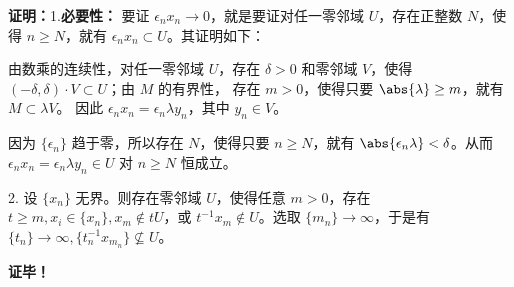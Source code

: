\textbf{证明：}1.\textbf{必要性：} 要证 $\epsilon_n x_n\rightarrow0$，就是要证对任一零邻域 $U$，存在正整数 $N$，使得 $n\geq N$，就有 $\epsilon_n x_n\subset U$。其证明如下：

由数乘的连续性，对任一零邻域 $U$，存在 $\delta>0$ 和零邻域 $V$，使得 $(-\delta,\delta)\cdot V\subset U$；由 $M$ 的有界性， 存在 $m>0$，使得只要 $\abs{\lambda}\geq m$，就有 $M\subset\lambda V$。 因此 $\epsilon_nx_n=\epsilon_n \lambda y_n$，其中 $y_n\in V$。

因为 $\{\epsilon_n\}$ 趋于零，所以存在 $N$，使得只要 $n\geq N$，就有 $\abs{\epsilon_n\lambda}<\delta$。从而 $\epsilon_nx_n=\epsilon_n \lambda y_n\in U$ 对 $n\geq N$ 恒成立。


2. 设 $\{x_n\}$ 无界。则存在零邻域 $U$，使得任意 $m>0$，存在 $t\geq m,x_i\in\{x_n\},x_{m}\notin tU$，或 $t^{-1}x_m\notin U$。选取 $\{m_n\}\rightarrow\infty$，于是有 $\{t_n\}\rightarrow\infty,\{t_n^{-1}x_{m_n}\}\nsubseteq U$。


\textbf{证毕！}












